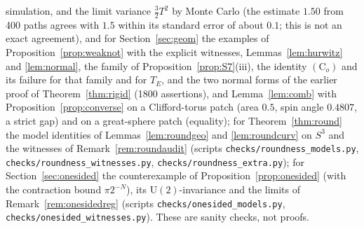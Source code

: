 \documentclass[11pt,reqno]{amsart}
\theoremstyle{definition}
\theoremstyle{remark}
\numberwithin{equation}{section}
\begin{document}
simulation, and the limit variance $\tfrac32T^2$ by Monte Carlo (the estimate $1.50$ from 400 paths agrees with $1.5$ within
its standard error of about $0.1$; this is not an exact agreement), and for Section~\ref{sec:geom} the examples of
Proposition~\ref{prop:weaknot} with the explicit witnesses, Lemmas~\ref{lem:hurwitz} and \ref{lem:normal}, the family of
Proposition~\ref{prop:S7}(iii), the identity $(\mathrm C_o)$ and its failure for that family and for $T_E$, and the two normal forms of the
earlier proof of Theorem~\ref{thm:rigid} (1800 assertions), and Lemma~\ref{lem:comb} with Proposition~\ref{prop:converse} on a
Clifford-torus patch (area $0.5$, spin angle $0.4807$, a strict gap) and on a great-sphere patch (equality); for
Theorem~\ref{thm:round} the model identities of Lemmas~\ref{lem:roundgeo} and \ref{lem:roundcurv} on $S^3$ and the witnesses of
Remark~\ref{rem:roundaudit} (scripts \texttt{checks/roundness\_models.py}, \texttt{checks/roundness\_witnesses.py},
\texttt{checks/roundness\_extra.py}); for Section~\ref{sec:onesided} the counterexample of Proposition~\ref{prop:onesided} (with the
contraction bound $\pi2^{-N}$), its $\mathrm U(2)$-invariance and the limits of Remark~\ref{rem:onesidedreg} (scripts
\texttt{checks/onesided\_models.py}, \texttt{checks/onesided\_witnesses.py}).  These are sanity checks, not proofs.
\end{document}
